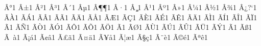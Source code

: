\documentclass{article}
\begin{document}
{        {^^c2^^b0}{{\textdegree}}1  %
        {^^c2^^b1}{{\textpm}}1  %
        {^^c2^^b2}{{\texttwosuperior}}1  %
        {^^c2^^b3}{{\textthreesuperior}}1  %
        {^^c2^^b4}{{\textasciiacute}}1  %
        {^^c2^^b5}{{\textmu}}1  %
        {^^c2^^b6}{{\P}}1  %
        {^^c2^^b7}{{\textperiodcentered}}1  %
        {^^c2^^b8}{{\c{}}}1  %
        {^^c2^^b9}{{\textonesuperior}}1  %
        {^^c2^^ba}{{\textordmasculine}}1  %
        {^^c2^^bb}{{\guillemotright}}1  %
        {^^c2^^bc}{{\textonequarter}}1  %
        {^^c2^^bd}{{\textonehalf}}1  %
        {^^c2^^be}{{\textthreequarters}}1  %
        {^^c2^^bf}{{?`}}1  %
        {^^c3^^80}{{\`{A}}}1  %
        {^^c3^^81}{{\'{A}}}1  %
        {^^c3^^82}{{\^{A}}}1  %
        {^^c3^^83}{{\~{A}}}1  %
        {^^c3^^84}{{\"{A}}}1  %
        {^^c3^^85}{{\AA}}1  %
        {^^c3^^86}{{\AE}}1  %
        {^^c3^^87}{{\c{C}}}1  %
        {^^c3^^88}{{\`{E}}}1  %
        {^^c3^^89}{{\'{E}}}1  %
        {^^c3^^8a}{{\^{E}}}1  %
        {^^c3^^8b}{{\"{A}}}1  %
        {^^c3^^8c}{{\`{I}}}1  %
        {^^c3^^8d}{{\'{I}}}1  %
        {^^c3^^8e}{{\^{I}}}1  %
        {^^c3^^8f}{{\"{I}}}1  %
        {^^c3^^90}{{\DH}}1  %
        {^^c3^^91}{{\~{N}}}1  %
        {^^c3^^92}{{\`{O}}}1  %
        {^^c3^^93}{{\'{O}}}1  %
        {^^c3^^94}{{\^{O}}}1  %
        {^^c3^^95}{{\~{O}}}1  %
        {^^c3^^96}{{\"{O}}}1  %
        {^^c3^^97}{{\texttimes}}1  %
        {^^c3^^98}{{\O}}1  %
        {^^c3^^99}{{\`{U}}}1  %
        {^^c3^^9a}{{\'{U}}}1  %
        {^^c3^^9b}{{\^{U}}}1  %
        {^^c3^^9c}{{\"{U}}}1  %
        {^^c3^^9d}{{\'{Y}}}1  %
        {^^c3^^9e}{{\TH}}1  %
        {^^c3^^9f}{{\ss}}1  %
        {^^c3^^a0}{{\`{a}}}1  %
        {^^c3^^a1}{{\'{a}}}1  %
        {^^c3^^a2}{{\^{a}}}1  %
        {^^c3^^a3}{{\~{a}}}1  %
        {^^c3^^a4}{{\"{a}}}1  %
        {^^c3^^a5}{{\aa}}1  %
        {^^c3^^a6}{{\ae}}1  %
        {^^c3^^a7}{{\c{c}}}1  %
        {^^c3^^a8}{{\`{e}}}1  %
        {^^c3^^a9}{{\'{e}}}1  %
        {^^c3^^aa}{{\^{e}}}1  %
}
\end{document}
